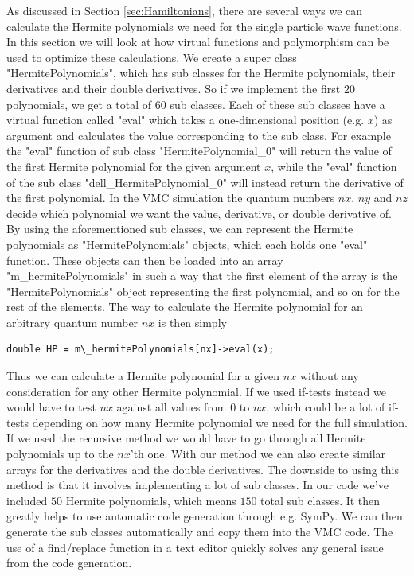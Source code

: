 \documentclass[../main.tex]{subfiles}
\begin{document}
As discussed in Section \ref{sec:Hamiltonians}, there are several ways we can calculate the Hermite polynomials we need for the single particle wave functions. In this section we will look at how virtual functions and polymorphism can be used to optimize these calculations. We create a super class "HermitePolynomials", which has sub classes for the Hermite polynomials, their derivatives and their double derivatives. So if we implement the first $20$ polynomials, we get a total of $60$ sub classes. Each of these sub classes have a virtual function called "eval" which takes a one-dimensional position (e.g. $x$) as argument and calculates the value corresponding to the sub class. For example the "eval" function of sub class "HermitePolynomial\_0" will return the value of the first Hermite polynomial for the given argument $x$, while the "eval" function of the sub class "dell\_HermitePolynomial\_0" will instead return the derivative of the first polynomial. In the VMC simulation the quantum numbers $nx$, $ny$ and $nz$ decide which polynomial we want the value, derivative, or double derivative of. By using the aforementioned sub classes, we can represent the Hermite polynomials as "HermitePolynomials" objects, which each holds one "eval" function. These objects can then be loaded into an array "m\_hermitePolynomials" in such a way that the first element of the array is the "HermitePolynomials" object representing the first polynomial, and so on for the rest of the elements. The way to calculate the Hermite polynomial for an arbitrary quantum number $nx$ is then simply
\lstset{language=c++}
\begin{lstlisting}[caption={}]
double HP = m\_hermitePolynomials[nx]->eval(x);
\end{lstlisting}
Thus we can calculate a Hermite polynomial for a given $nx$ without any consideration for any other Hermite polynomial. If we used if-tests instead we would have to test $nx$ against all values from $0$ to $nx$, which could be a lot of if-tests depending on how many Hermite polynomial we need for the full simulation. If we used the recursive method we would have to go through all Hermite polynomials up to the $nx$'th one. With our method we can also create similar arrays for the derivatives and the double derivatives. The downside to using this method is that it involves implementing a lot of sub classes. In our code we've included $50$ Hermite polynomials, which means $150$ total sub classes. It then greatly helps to use automatic code generation through e.g. SymPy. We can then generate the sub classes automatically and copy them into the VMC code. The use of a find/replace function in a text editor quickly solves any general issue from the code generation. 
\end{document}
